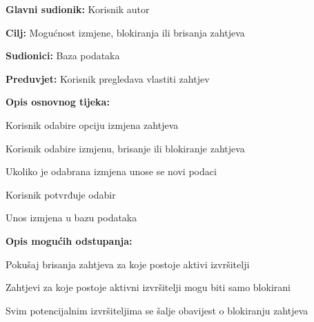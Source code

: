 					\noindent {}
					\begin{packed_item}
						
						\item \textbf{Glavni sudionik: }Korisnik autor
						\item  \textbf{Cilj:} Mogućnost izmjene, blokiranja ili brisanja zahtjeva
						\item  \textbf{Sudionici:} Baza podataka
						\item  \textbf{Preduvjet:} Korisnik pregledava vlastiti zahtjev
						\item  \textbf{Opis osnovnog tijeka:}
						
						\item[] \begin{packed_enum}
							
							\item Korisnik odabire opciju izmjena zahtjeva
							\item Korisnik odabire izmjenu, brisanje ili blokiranje zahtjeva
							\item Ukoliko je odabrana izmjena unose se novi podaci
							\item Korisnik potvrđuje odabir
							\item Unos izmjena u bazu podataka
							
						\end{packed_enum}
					
						\item  \textbf{Opis mogućih odstupanja:}
						
						\item[] \begin{packed_item}
							
							\item[2.a] Pokušaj brisanja zahtjeva za koje postoje aktivi izvršitelji
							\item[] \begin{packed_enum}
								
								\item Zahtjevi za koje postoje aktivni izvršitelji mogu biti samo blokirani
								\item Svim potencijalnim izvršiteljima se šalje obavijest o blokiranju zahtjeva
								
							\end{packed_enum}				
						\end{packed_item}
						
					\end{packed_item}
				
